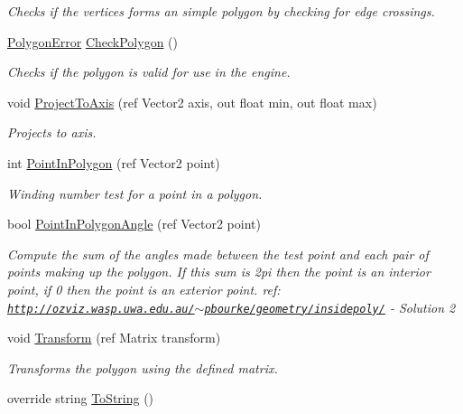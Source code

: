 \begin{DoxyCompactItemize}
\begin{DoxyCompactList}\small\item\em Checks if the vertices forms an simple polygon by checking for edge crossings. \end{DoxyCompactList}\item 
\hyperlink{namespace_farseer_physics_1_1_common_a7a8a016dd0516330948901c81e5019e2}{Polygon\+Error} \hyperlink{class_farseer_physics_1_1_common_1_1_vertices_aa0b17bd05010f2f4dc9efcb237951891}{Check\+Polygon} ()
\begin{DoxyCompactList}\small\item\em Checks if the polygon is valid for use in the engine. \end{DoxyCompactList}\item 
void \hyperlink{class_farseer_physics_1_1_common_1_1_vertices_a6f197081f7fc8906989f2cfc028fd0ae}{Project\+To\+Axis} (ref Vector2 axis, out float min, out float max)
\begin{DoxyCompactList}\small\item\em Projects to axis. \end{DoxyCompactList}\item 
int \hyperlink{class_farseer_physics_1_1_common_1_1_vertices_a8f0d3dffbce7b6372757cbfbf274ff6e}{Point\+In\+Polygon} (ref Vector2 point)
\begin{DoxyCompactList}\small\item\em Winding number test for a point in a polygon. \end{DoxyCompactList}\item 
bool \hyperlink{class_farseer_physics_1_1_common_1_1_vertices_a7387a33ad4bc4fcf420bdd93ea0f3e61}{Point\+In\+Polygon\+Angle} (ref Vector2 point)
\begin{DoxyCompactList}\small\item\em Compute the sum of the angles made between the test point and each pair of points making up the polygon. If this sum is 2pi then the point is an interior point, if 0 then the point is an exterior point. ref\+: \href{http://ozviz.wasp.uwa.edu.au/~pbourke/geometry/insidepoly/}{\tt http\+://ozviz.\+wasp.\+uwa.\+edu.\+au/$\sim$pbourke/geometry/insidepoly/} -\/ Solution 2 \end{DoxyCompactList}\item 
void \hyperlink{class_farseer_physics_1_1_common_1_1_vertices_a5f142425c62a49568b595021e92cd003}{Transform} (ref Matrix transform)
\begin{DoxyCompactList}\small\item\em Transforms the polygon using the defined matrix. \end{DoxyCompactList}\item 
override string \hyperlink{class_farseer_physics_1_1_common_1_1_vertices_a6dc89918d1f1d196965a8526504be73c}{To\+String} ()
\end{DoxyCompactItemize}
